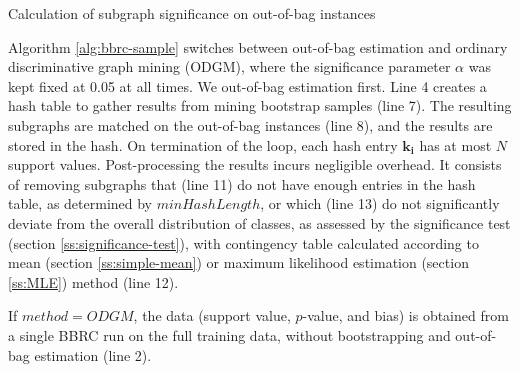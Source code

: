 \documentclass{sig-alternate}
\begin{document}
\begin{algorithm2e*}[t]
  \fontsize{8}{10}
  \selectfont
  \caption{Calculation of subgraph significance on out-of-bag instances\label{alg:bbrc-sample}}
\end{algorithm2e*}
Algorithm \ref{alg:bbrc-sample} switches between out-of-bag estimation and ordinary discriminative graph mining (ODGM), where 
the significance parameter $\alpha$ was kept fixed at 0.05 at all times.
We out-of-bag estimation first.  Line 4
creates a hash table to gather results from mining bootstrap samples 
(line 7). The resulting subgraphs are matched on the out-of-bag instances (line
8), and the results are stored in the hash. On termination of the loop, each hash
entry $\mathbf{k_i}$ has at most $N$ support values. Post-processing the results
incurs negligible overhead. It
consists of removing subgraphs that (line 11) do not have enough entries in the hash table, as
determined by $minHashLength$, or which (line 13) do not significantly
deviate from the overall distribution of classes, as assessed by the significance
test (section \ref{ss:significance-test}), with contingency table calculated
according to mean (section \ref{ss:simple-mean}) or maximum likelihood
estimation (section \ref{ss:MLE}) method (line 12). 

If $method=ODGM$, the data (support value, $p$-value, and bias) is obtained from a single BBRC run on the full training data, without bootstrapping and out-of-bag estimation (line 2).
\end{document}
